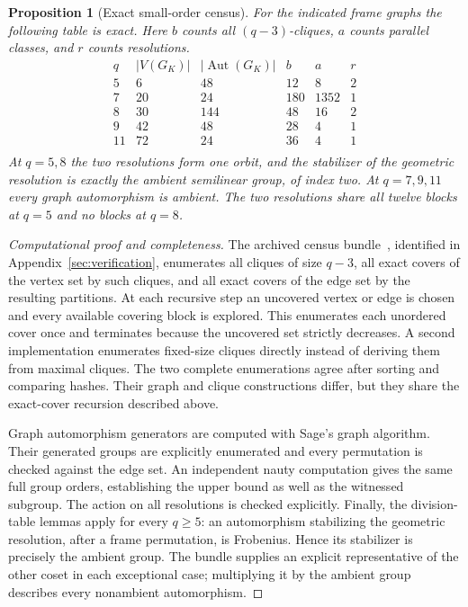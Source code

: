 \documentclass[11pt]{article}
\newtheorem{proposition}[theorem]{Proposition}
\theoremstyle{definition}
\theoremstyle{remark}
\newcommand{\Aut}{\operatorname{Aut}}
\begin{document}
\begin{samepage}
\begin{proposition}[Exact small-order census]\label{prop:boundary}
For the indicated frame graphs the following table is exact. Here $b$
counts all $(q-3)$-cliques, $a$ counts parallel classes,
and $r$ counts resolutions.
\[
\begin{array}{c|r|r|r|r|r}
q&|V(G_K)|&|\Aut(G_K)|&b&a&r\\\hline
5&6&48&12&8&2\\
7&20&24&180&1352&1\\
8&30&144&48&16&2\\
9&42&48&28&4&1\\
11&72&24&36&4&1\\
\end{array}
\]
At $q=5,8$ the two resolutions form one orbit, and the stabilizer of the
geometric resolution is exactly the ambient semilinear group, of index
two. At $q=7,9,11$ every graph automorphism is ambient.
The two resolutions share all twelve blocks at $q=5$ and no blocks at $q=8$.
\end{proposition}
\end{samepage}
\begin{proof}[Computational proof and completeness]
The archived census bundle~\cite{CensusArtifact}, identified in
Appendix~\ref{sec:verification}, enumerates
all cliques of size $q-3$, all exact covers of the vertex set by such
cliques, and all exact covers of the edge set by the resulting partitions.
At each recursive step an uncovered vertex or edge is chosen and every
available covering block is explored. This enumerates each unordered
cover once and terminates because the uncovered set strictly decreases.
A second implementation enumerates fixed-size cliques directly instead
of deriving them from maximal cliques. The two complete enumerations
agree after sorting and comparing hashes. Their graph and clique constructions differ,
but they share the exact-cover recursion described above.

Graph automorphism generators are computed with Sage's graph algorithm.
Their generated groups are explicitly enumerated and every permutation
is checked against the edge set. An independent nauty computation gives
the same full group orders, establishing the upper bound as well as the
witnessed subgroup. The action on all resolutions is checked explicitly.
Finally, the division-table lemmas apply for every $q\ge5$: an automorphism
stabilizing the geometric resolution, after a frame permutation, is
Frobenius. Hence its stabilizer is precisely the ambient group. The
bundle supplies an explicit representative of the other coset in each
exceptional case; multiplying it by the ambient group describes every
nonambient automorphism.
\end{proof}
\end{document}

